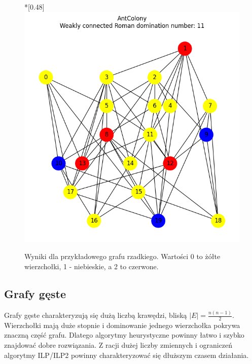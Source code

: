 \begin{figure}[H]
        \hfill
        \begin{subcaptionbox}*{}[0.48\linewidth]
            {\includegraphics[width=0.75\linewidth]{assets/plots/AntColony/ErdosRenyi_sparse_n20_i2_results.png}}
        \end{subcaptionbox}
    
        \caption{Wyniki dla przykładowego grafu rzadkiego. Wartości 0 to żółte wierzchołki, 1 - niebieskie, a 2 to czerwone.}
        \label{fig:sparse}
    \end{figure}

\subsection{Grafy gęste}

Grafy gęste charakteryzują się dużą liczbą krawędzi, bliską $|E| = \frac{n(n - 1)}{2}$. Wierzchołki mają duże stopnie i dominowanie jednego wierzchołka pokrywa znaczną część grafu. Dlatego algorytmy heurystyczne powinny łatwo i szybko znajdować dobre rozwiązania. Z racji dużej liczby zmiennych i ograniczeń algorytmy ILP/ILP2 powinny charakteryzować się dłuższym czasem działania.

